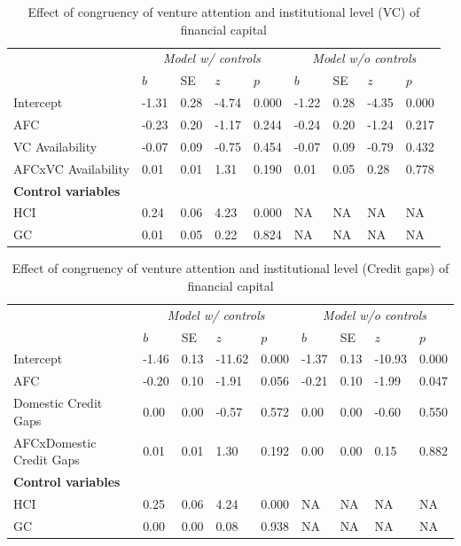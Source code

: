 \documentclass[
  english,
  man]{apa6}
\begin{document}
\begin{table}

\caption{\label{tab:unnamed-chunk-18}Effect of congruency of venture attention and institutional level (VC) of financial capital}
\centering
\begin{tabular}[t]{l|l|l|l|l|l|l|l|l}
\hline
\multicolumn{1}{c|}{\em{ }} & \multicolumn{4}{c|}{\em{Model w/ controls}} & \multicolumn{4}{c}{\em{Model w/o controls}} \\
\cline{2-5} \cline{6-9}
  & $b$ & SE & $z$ & $p$ & $b$ & SE & $z$ & $p$\\
\hline
Intercept & -1.31 & 0.28 & -4.74 & 0.000 & -1.22 & 0.28 & -4.35 & 0.000\\
\hline
AFC & -0.23 & 0.20 & -1.17 & 0.244 & -0.24 & 0.20 & -1.24 & 0.217\\
\hline
VC Availability & -0.07 & 0.09 & -0.75 & 0.454 & -0.07 & 0.09 & -0.79 & 0.432\\
\hline
AFCxVC Availability & 0.01 & 0.01 & 1.31 & 0.190 & 0.01 & 0.05 & 0.28 & 0.778\\
\hline
\multicolumn{9}{l}{\textbf{Control variables}}\\
\hline
\hspace{1em}HCI & 0.24 & 0.06 & 4.23 & 0.000 & NA & NA & NA & NA\\
\hline
\hspace{1em}GC & 0.01 & 0.05 & 0.22 & 0.824 & NA & NA & NA & NA\\
\hline
\end{tabular}
\end{table}

\begin{table}

\caption{\label{tab:unnamed-chunk-18}Effect of congruency of venture attention and institutional level (Credit gaps) of financial capital}
\centering
\begin{tabular}[t]{l|l|l|l|l|l|l|l|l}
\hline
\multicolumn{1}{c|}{\em{ }} & \multicolumn{4}{c|}{\em{Model w/ controls}} & \multicolumn{4}{c}{\em{Model w/o controls}} \\
\cline{2-5} \cline{6-9}
  & $b$ & SE & $z$ & $p$ & $b$ & SE & $z$ & $p$\\
\hline
Intercept & -1.46 & 0.13 & -11.62 & 0.000 & -1.37 & 0.13 & -10.93 & 0.000\\
\hline
AFC & -0.20 & 0.10 & -1.91 & 0.056 & -0.21 & 0.10 & -1.99 & 0.047\\
\hline
Domestic Credit Gaps & 0.00 & 0.00 & -0.57 & 0.572 & 0.00 & 0.00 & -0.60 & 0.550\\
\hline
AFCxDomestic Credit Gaps & 0.01 & 0.01 & 1.30 & 0.192 & 0.00 & 0.00 & 0.15 & 0.882\\
\hline
\multicolumn{9}{l}{\textbf{Control variables}}\\
\hline
\hspace{1em}HCI & 0.25 & 0.06 & 4.24 & 0.000 & NA & NA & NA & NA\\
\hline
\hspace{1em}GC & 0.00 & 0.00 & 0.08 & 0.938 & NA & NA & NA & NA\\
\hline
\end{tabular}
\end{table}
\end{document}
